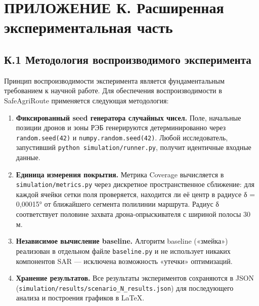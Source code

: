 \documentclass[14pt,a4paper]{extarticle}
\begin{document}
\hypertarget{ux43fux440ux438ux43bux43eux436ux435ux43dux438ux435-ux43a.-ux440ux430ux441ux448ux438ux440ux435ux43dux43dux430ux44f-ux44dux43aux441ux43fux435ux440ux438ux43cux435ux43dux442ux430ux43bux44cux43dux430ux44f-ux447ux430ux441ux442ux44c}{%
\section{ПРИЛОЖЕНИЕ К. Расширенная экспериментальная часть}\label{ux43fux440ux438ux43bux43eux436ux435ux43dux438ux435-ux43a.-ux440ux430ux441ux448ux438ux440ux435ux43dux43dux430ux44f-ux44dux43aux441ux43fux435ux440ux438ux43cux435ux43dux442ux430ux43bux44cux43dux430ux44f-ux447ux430ux441ux442ux44c}}

\hypertarget{ux43a.1-ux43cux435ux442ux43eux434ux43eux43bux43eux433ux438ux44f-ux432ux43eux441ux43fux440ux43eux438ux437ux432ux43eux434ux438ux43cux43eux433ux43e-ux44dux43aux441ux43fux435ux440ux438ux43cux435ux43dux442ux430}{%
\subsection{К.1 Методология воспроизводимого эксперимента}\label{ux43a.1-ux43cux435ux442ux43eux434ux43eux43bux43eux433ux438ux44f-ux432ux43eux441ux43fux440ux43eux438ux437ux432ux43eux434ux438ux43cux43eux433ux43e-ux44dux43aux441ux43fux435ux440ux438ux43cux435ux43dux442ux430}}

Принцип воспроизводимости эксперимента является фундаментальным требованием к научной работе. Для обеспечения воспроизводимости в SafeAgriRoute применяется следующая методология:

\begin{enumerate}
\def\labelenumi{\arabic{enumi}.}
\item
  \textbf{Фиксированный seed генератора случайных чисел.} Поле, начальные позиции дронов и зоны РЭБ генерируются детерминированно через \texttt{random.seed(42)} и \texttt{numpy.random.seed(42)}. Любой исследователь, запустивший \texttt{python\ simulation/runner.py}, получит идентичные входные данные.
\item
  \textbf{Единица измерения покрытия.} Метрика Coverage вычисляется в \texttt{simulation/metrics.py} через дискретное пространственное сближение: для каждой ячейки сетки поля проверяется, находится ли её центр в радиусе δ = 0,00015° от ближайшего сегмента полилинии маршрута. Радиус δ соответствует половине захвата дрона-опрыскивателя с шириной полосы 30 м.
\item
  \textbf{Независимое вычисление baseline.} Алгоритм baseline («змейка») реализован в отдельном файле \texttt{baseline.py} и не использует никаких компонентов SAR --- исключена возможность «утечки» оптимизаций.
\item
  \textbf{Хранение результатов.} Все результаты экспериментов сохраняются в JSON (\texttt{simulation/results/scenario\_N\_results.json}) для последующего анализа и построения графиков в LaTeX.
\end{enumerate}
\end{document}
